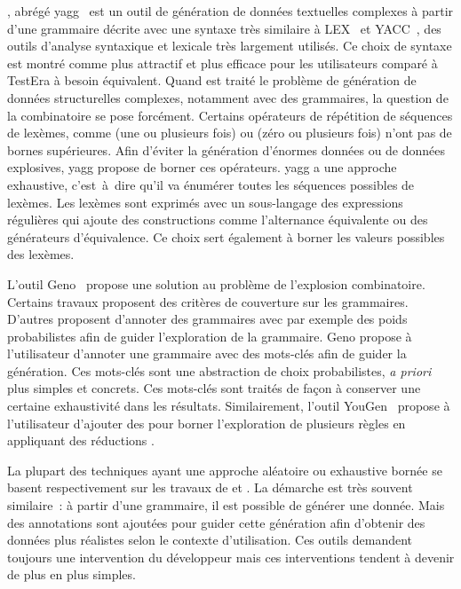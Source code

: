 , abrégé yagg~ est
un outil de génération de données textuelles complexes à partir d'une grammaire
décrite avec une syntaxe très similaire à LEX~ et
YACC~, des outils d'analyse syntaxique et lexicale très
largement utilisés. Ce choix de syntaxe est montré comme plus attractif et plus
efficace pour les utilisateurs comparé à TestEra à besoin équivalent. Quand est
traité le problème de génération de données structurelles complexes, notamment
avec des grammaires, la question de la combinatoire se pose forcément. Certains
opérateurs de répétition de séquences de lexèmes, comme \code{+} (une ou
plusieurs fois) ou \code{*} (zéro ou plusieurs fois) n'ont pas de bornes
supérieures. Afin d'éviter la génération d'énormes données ou de données
explosives, yagg propose de borner ces opérateurs. yagg a une approche
exhaustive, c'est~à~dire qu'il va énumérer toutes les séquences possibles de
lexèmes. Les lexèmes sont exprimés avec un sous-langage des expressions
régulières qui ajoute des constructions comme l'alternance équivalente ou des
générateurs d'équivalence.  Ce choix sert également à borner les valeurs
possibles des lexèmes.

L'outil Geno~ propose une solution au problème de l'explosion
combinatoire. Certains travaux proposent des critères de couverture sur les
grammaires. D'autres proposent d'annoter des grammaires avec par exemple des
poids probabilistes afin de guider l'exploration de la grammaire. Geno propose à
l'utilisateur d'annoter une grammaire avec des mots-clés afin de guider la
génération. Ces mots-clés sont une abstraction de choix probabilistes, {\em a
priori} plus simples et concrets. Ces mots-clés sont traités de façon à
conserver une certaine exhaustivité dans les résultats. Similairement, l'outil
YouGen~ propose à l'utilisateur d'ajouter des
 pour borner l'exploration de plusieurs règles en appliquant des
réductions .

La plupart des techniques ayant une approche aléatoire ou exhaustive bornée se
basent respectivement sur les travaux de  et
. La démarche est très souvent similaire~: à partir d'une
grammaire, il est possible de générer une donnée. Mais des annotations sont
ajoutées pour guider cette génération afin d'obtenir des données plus réalistes
selon le contexte d'utilisation. Ces outils demandent toujours une intervention
du développeur mais ces interventions tendent à devenir de plus en plus simples.

